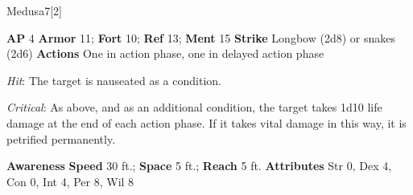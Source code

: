 \begin{monsection}{Medusa}{7}[2]
\vspace{-1em}\vspace{-1em}
\begin{spellcontent}
\begin{spelltargetinginfo}
{\textbf{AP} 4}
\pari \textbf{Armor} 11;
\textbf{Fort} 10;
\textbf{Ref} 13;
\textbf{Ment} 15
\pari \textbf{Strike} Longbow  (2d8) or snakes  (2d6)
\pari \textbf{Actions} One in action phase, one in delayed action phase
\end{spelltargetinginfo}
\begin{spelleffects}
\pari
{}
\par
\par \textit{Hit}: The target is nauseated as a condition.
\par \textit{Critical}:
As above, and as an additional condition, the target takes 1d10 life damage at the end of each action phase.
If it takes vital damage in this way, it is petrified permanently.
\end{spelleffects}
\end{spellcontent}
\begin{spellsubcontent}
\begin{spellfooter}
\pari \textbf{Awareness} 
\pari \textbf{Speed} 30 ft.;
\textbf{Space} 5 ft.;
\textbf{Reach} 5 ft.
\pari \textbf{Attributes}
Str 0,
Dex 4,
Con 0,
Int 4,
Per 8,
Wil 8
\end{spellfooter}
\end{spellsubcontent}
\end{monsection}
